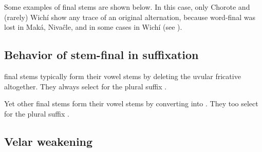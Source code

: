 \begin{exe}
    \ex \fruit
    \ex \mouth
    \ex \coal
    \ex \locustmn
    \ex \soninlaw
    \ex \treen
    \ex \hunger
    \ex \vulture
    \ex \feminine
    \ex \elderbro
    \ex \eldersis
    \ex \youngersis
    \ex \pet
    \ex \louse
    \ex \seed
    \ex \fatpe
    \ex \beard
    \ex \leg
    \ex \dinlaw
    \ex \eyelash
    \ex \eye
    \ex \face
    \ex \eyebrow
    \ex \rheum
    \ex \woodpecker
    \ex \tooth
    \ex \expert
    \ex \rib
    \ex \bat
    \ex \mosquito
    \ex \pigeon
\end{exe}

Some examples of final stems are shown below. In this case, only Chorote and (rarely) Wichí show any trace of an original alternation, because word-final  was lost in Maká, Nivaĉle, and in some cases in Wichí (see ).

\begin{exe}
    \ex \companion
    \ex \lizard
    \ex \neighbor
    \ex \dog
    \ex \hornero
    \ex \moon
    \ex \rat
    \ex \doveula
    \ex \lessergrison
\end{exe}

\subsection{Behavior of stem-final  in suffixation}\label{jj-suff}

final stems typically form their vowel stems by deleting the uvular fricative altogether. They always select for the plural suffix .

\begin{exe}
    \ex \ocelot
    \ex \barnowl
    \ex \many
    \ex \longv
    \ex \anteater
    \ex \pseudo
    \ex \far
    \ex \largefat
    \ex \rhea
    \ex \argentineboa
    \ex \chaguara
    \ex \firei
\end{exe}

Yet other final stems form their vowel stems by converting  into . They too select for the plural suffix .

\begin{exe}
    \ex \centipede
    \ex \oldn
    \ex \piranhamn
    \ex \caracara
\end{exe}

\subsection{Velar weakening}\label{velar-weakening}

